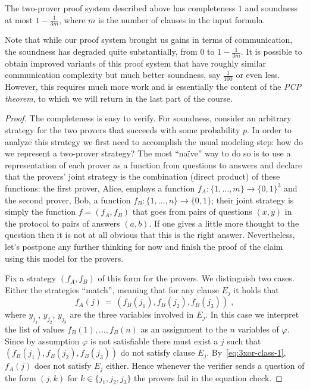 \begin{claim}\label{claim:3xor-class}
The two-prover proof system described above has completeness $1$ and soundness at most $1-\frac{1}{3m}$, where $m$ is the number of clauses in the input formula. 
\end{claim}

Note that while our proof system brought us gains in terms of communication, the soundness has degraded quite substantially, from $0$ to $1-\frac{1}{3m}$. It is possible to obtain improved variants of this proof system that have roughly similar communication complexity but much better soundness, say $\frac{1}{100}$ or even less. However, this requires much more work and is essentially the content of the \emph{PCP theorem}, to which we will return in the last part of the course. 

\begin{proof}
The completeness is easy to verify. For soundness, consider an arbitrary strategy for the two provers that succeeds with some probability $p$. In order to analyze this strategy we first need to accomplish the usual modeling step: how do we represent a two-prover strategy? The most ``na\"ive'' way to do so is to use a representation of each prover as a function from questions to answers and declare that the provers' joint strategy is the combination (direct product) of these functions: the first prover, Alice, employs a function $f_A: \{1,\ldots,m\} \to \{0,1\}^3$ and the second prover, Bob, a function $f_B:\{1,\ldots,n\}\to\{0,1\}$; their joint strategy is simply the function $f=(f_A,f_B)$ that goes from pairs of questions $(x,y)$ in the protocol to pairs of answers $(a,b)$. 
If one gives a little more thought to the question then it is not at all obvious that this is the right answer. Nevertheless, let's postpone any further thinking for now and finish the proof of the claim using this model for the provers. 

Fix a strategy $(f_A,f_B)$ of this form for the provers. We distinguish two cases. Either the strategies ``match'', meaning that for any clause $E_j$ it holds that 
\begin{equation}\label{eq:3xor-class-1}
f_A(j)\,=\,(f_B(j_1),f_B(j_2),f_B(j_3))\;,
\end{equation}
 where $y_{j_1}$, $y_{j_2}$, $y_{j_3}$ are the three variables involved in $E_j$. In this case we interpret the list of values $f_B(1),\ldots,f_B(n)$ as an assignment to the $n$ variables of $\varphi$. Since by assumption $\varphi$ is not satisfiable there must exist a $j$ such that $(f_B(j_1),f_B(j_2),f_B(j_3))$ do not satisfy clause $E_j$. By~\eqref{eq:3xor-class-1}, $f_A(j)$ does not satisfy $E_j$ either. Hence whenever the verifier sends a question of the form $(j,k)$ for $k\in \{j_1,j_2,j_3\}$ the provers fail in the equation check. 


\end{proof}
